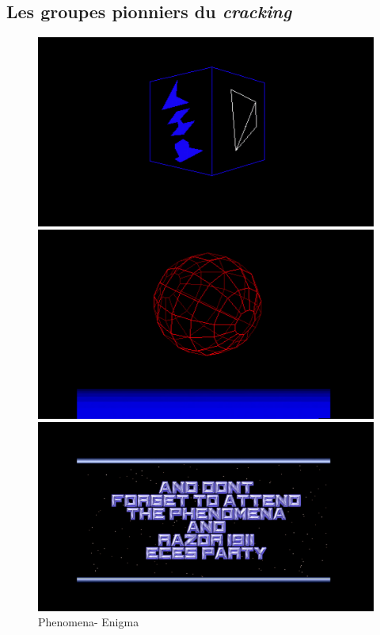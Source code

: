 \subsection*{Les groupes pionniers du \textit{cracking}}
\begin{figure}[h]
  \begin{minipage}[b]{0.30\linewidth}
    \centering
    \includegraphics[width=\linewidth]{images/demoscene/demos/pheno1.png}
  \end{minipage}
  \hfill
  \begin{minipage}[b]{0.30\linewidth}
    \centering
    \includegraphics[width=\linewidth]{images/demoscene/demos/pheno2.png}
  \end{minipage}
  \hfill
  \begin{minipage}[b]{0.30\linewidth}
    \centering
    \includegraphics[width=\linewidth]{images/demoscene/demos/pheno3.png}
  \end{minipage}
  \caption{Phenomena- Enigma}
  \label{pheno}
\end{figure}

